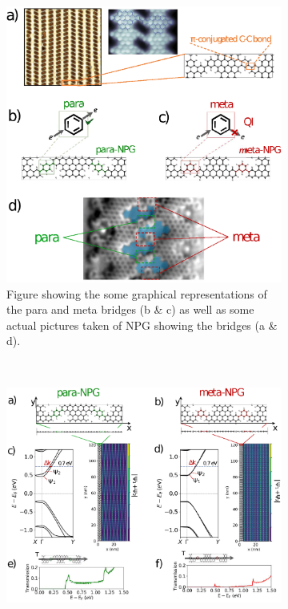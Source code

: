 \begin{figure}
    \centering
    \begin{subfigure}[b]{0.48\textwidth}
    \centering
    \includegraphics[width=\textwidth]{Figures/Fig_1.eps}
    \caption{Figure showing the some graphical representations of the para and meta bridges (b \& c) as well as some actual pictures taken of NPG showing the bridges (a \& d).}
    \label{studyfig1}
    \end{subfigure}
    ~
    \begin{subfigure}[b]{0.48\textwidth}
    \centering
    \includegraphics[width=\textwidth]{Figures/Fig_2.eps}

\end{subfigure}
\end{figure}
